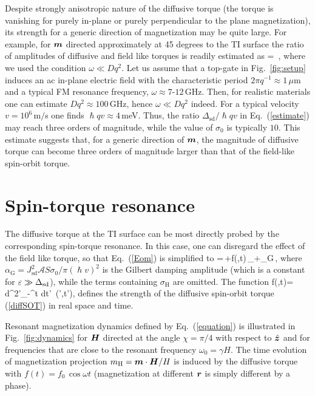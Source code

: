 Despite strongly anisotropic nature of the diffusive torque (the torque is vanishing for purely in-plane or purely perpendicular to the plane magnetization), its strength for a generic direction of magnetization may be quite large. For example, for $\boldsymbol{m}$ directed approximately at 45 degrees to the TI surface the ratio of amplitudes of diffusive and field like torques is readily estimated as  
\be
\label{estimate}
 = \,,
\e
where we used the condition $\omega \ll Dq^2$.  Let us assume that a top-gate in Fig.~\ref{fig:setup} induces an ac in-plane electric field with the characteristic period $2\pi q^{-1}\approx 1$\,$\mu$m and a typical FM resonance frequency, $\omega\approx 7$-$12$\,GHz. Then, for realistic materials one can estimate $Dq^2\approx 100$\,GHz, hence $\omega \ll Dq^2$ indeed. For a typical velocity $v=10^6$\,m$/$s one finds  $\hslash q v\approx 4$\,meV. Thus, the ratio $\Delta_\textrm{sd}/\hslash q v$ in Eq.~(\ref{estimate}) may reach three orders of magnitude, while the value of $\sigma_0$ is typically $10$. This estimate suggests that, for a generic direction of $\boldsymbol{m}$, the magnitude of diffusive  torque can become three orders of magnitude larger than that of the field-like spin-orbit torque. 

\section{Spin-torque resonance}
The diffusive torque at the TI surface can be most directly probed by the corresponding spin-torque resonance. In this case, one can disregard the effect of the field like torque, so that Eq.~(\ref{Eom}) is simplified to
\be
\label{equation}
=\gamma\,\times {}+f(,t)\,\times{}_\perp+\alpha_\textrm{G}\,\times{},
\e
where $\alpha_\textrm{G}= J_\textrm{sd}^2 \mathcal{A}S \sigma_0/\pi(\hslash v)^2$ is the Gilbert damping amplitude (which is a constant for $\varepsilon \gg \Delta_\textrm{sd}$), while the terms containing $\sigma_\textrm{H}$ are omitted.  The function
\be
f(,t)=\eta\int\! d^2'\!\!\int_{-\infty}^t\!\!\!\! dt'\, \bb{\nabla}\cdot{}(',t'),
\e
defines the strength of the diffusive spin-orbit torque (\ref{diffSOT}) in real space and time.

Resonant magnetization dynamics defined by Eq.~(\ref{equation}) is illustrated in Fig.~\ref{fig:dynamics} for $\boldsymbol{H}$ directed at the angle $\chi =\pi/4$ with respect to $\hat{\boldsymbol{z}}$ and for frequencies that are close to the resonant frequency $\omega_0=\gamma H$. The time evolution of magnetization projection $m_\textrm{H}= \boldsymbol{m}\cdot \boldsymbol{H}/H$ is induced by the diffusive torque with $f(t)= f_0\,\cos\omega t$ (magnetization at different $\boldsymbol{r}$ is simply different by a phase). 

